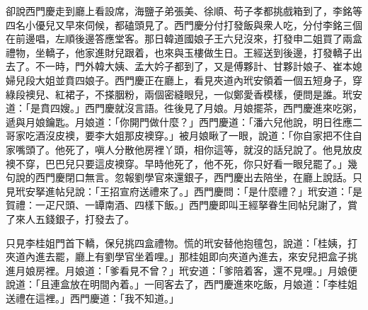 卻說西門慶走到廳上看設席，海鹽子弟張美、徐順、苟子孝都挑戲箱到了，李銘等四名小優兒又早來伺候，都磕頭見了。西門慶分付打發飯與衆人吃，分付李銘三個在前邊唱，左順後邊答應堂客。那日韓道國娘子王六兒沒來，打發申二姐買了兩盒禮物，坐轎子，他家進財兒跟着，也來與玉樓做生日。王經送到後邊，打發轎子出去了。不一時，門外韓大姨、孟大妗子都到了，又是傅夥計、甘夥計娘子、崔本媳婦兒段大姐並賁四娘子。西門慶正在廳上，看見夾道內玳安領着一個五短身子，穿綠段襖兒、紅裙子，不搽胭粉，兩個密縫眼兒，一似鄭愛香模樣，便問是誰。玳安道：「是賁四嫂。」西門慶就沒言語。{}徃後見了月娘。月娘擺茶，西門慶進來吃粥，遞與月娘鑰匙。月娘道：「你開門做什麼？」西門慶道：「潘六兒他說，明日徃應二哥家吃酒沒皮襖，要李大姐那皮襖穿。」被月娘瞅了一眼，說道：「你自家把不住自家嘴頭了。他死了，嗔人分散他房裡丫頭，相你這等，就沒的話兒說了。他見放皮襖不穿，巴巴兒只要這皮襖穿。早時他死了，他不死，你只好看一眼兒罷了。」{}幾句說的西門慶閉口無言。忽報劉學官來還銀子，西門慶出去陪坐，在廳上說話。只見玳安拏進帖兒說：「王招宣府送禮來了。」西門慶問：「是什麼禮？」玳安道：「是賀禮：一疋尺頭、一罈南酒、四樣下飯。」西門慶即叫王經拏眷生囘帖兒謝了，賞了來人五錢銀子，打發去了。

只見李桂姐門首下轎，保兒挑四盒禮物。慌的玳安替他抱氊包，說道：「桂姨，打夾道內進去罷，廳上有劉學官坐着哩。」那桂姐即向夾道內進去，來安兒把盒子挑進月娘房裡。月娘道：「爹看見不曾？」{}玳安道：「爹陪着客，還不見哩。」月娘便說道：「且連盒放在明間內着。」一囘客去了，西門慶進來吃飯，月娘道：「李桂姐送禮在這裡。」西門慶道：「我不知道。」

